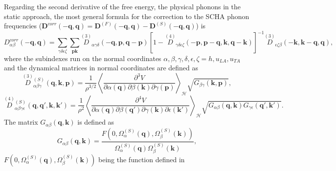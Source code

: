 Regarding the second derivative of the free energy, the physical phonons in the static approach, the most general
formula for the correction to the SCHA phonon frequencies ($\boldsymbol{D}^{corr}(-\boldsymbol{q},\boldsymbol{q})=\boldsymbol{D}^{(F)}(-\boldsymbol{q},\boldsymbol{q})-\boldsymbol{D}^{(S)}(-\boldsymbol{q},\boldsymbol{q})$) is
\begin{equation}
 \label{correction}
 D_{\alpha\beta}^{corr}(-\boldsymbol{q},\boldsymbol{q})=\sum_{\gamma\delta\epsilon\zeta}\sum_{\boldsymbol{p}\boldsymbol{k}}\overset{(3)}{D}{}_{\alpha\gamma\delta}(-\boldsymbol{q},\boldsymbol{p},
 \boldsymbol{q}-\boldsymbol{p})[1-\overset{(4)}{D}{}_{\gamma\delta\epsilon\zeta}(-\boldsymbol{p},\boldsymbol{p}-\boldsymbol{q},\boldsymbol{k},\boldsymbol{q}-\boldsymbol{k})]^{-1}\overset{(3)}{D}{}_{
 \epsilon\zeta\beta}(-\boldsymbol{k},\boldsymbol{k}-\boldsymbol{q},\boldsymbol{q}),
\end{equation}
where the subindexes run on the normal coordinates $\alpha,\beta,\gamma,\delta,\epsilon,\zeta=h,u_{LA},u_{TA}$ and 
the dynamical matrices in normal coordinates are defined as
\begin{equation}
 \label{third-order}
\overset{(3)}{D}{}^{(S)}_{\alpha\beta\gamma}(\boldsymbol{q},\boldsymbol{k},\boldsymbol{p})=\frac{1}{\rho^{3/2}}\left\langle\frac{\partial^{3}V}{\partial\alpha(\boldsymbol{q})\partial\beta(\boldsymbol{k})\partial\gamma(\boldsymbol{
 p})}\right\rangle_{\mathcal{H}}\sqrt{G_{\beta\gamma}(\boldsymbol{k},\boldsymbol{p})},
\end{equation}
\begin{equation}
 \label{fourth-order}
\overset{(4)}{D}{}^{(S)}_{\alpha\beta\gamma\epsilon}(\boldsymbol{q},\boldsymbol{q}',\boldsymbol{k},\boldsymbol{k}')=\frac{1}{\rho^{2}}\left\langle\frac{\partial^{4}V}{\partial\alpha(\boldsymbol{q})\partial\beta(\boldsymbol{
 q}')\partial\gamma(\boldsymbol{k})\partial\epsilon(\boldsymbol{k}')}\right\rangle_{\mathcal{H}}\sqrt{G_{\alpha\beta}(\boldsymbol{q},\boldsymbol{k})G_{\gamma\epsilon}(\boldsymbol{q}',\boldsymbol{k}')}.
\end{equation}
The matrix $G_{\alpha\beta}(\boldsymbol{q},\boldsymbol{k})$ is defined as
\begin{equation}
	G_{\alpha\beta}(\boldsymbol{q},\boldsymbol{k})=\frac{F(0,\Omega_{\alpha}^{(S)}(\boldsymbol{q}),\Omega_{\beta}^{(S)}(\boldsymbol{k}))}{\Omega_{\alpha}^{(S)}(\boldsymbol{q})\Omega_{\beta}^{(S)}(\boldsymbol{k})},
\end{equation}
$F(0,\Omega_{\alpha}^{(S)}(\boldsymbol{q}),\Omega_{\beta}^{(S)}(\boldsymbol{k}))$ being the function defined in
